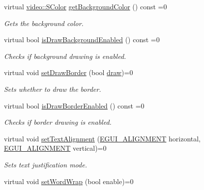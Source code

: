 \begin{DoxyCompactItemize}
virtual \hyperlink{classirr_1_1video_1_1SColor}{video\+::\+S\+Color} \hyperlink{classirr_1_1gui_1_1IGUIStaticText_a7149fff0b2c4159503f114807e0b0a83}{get\+Background\+Color} () const =0
\begin{DoxyCompactList}\small\item\em Gets the background color. \end{DoxyCompactList}\item 
virtual bool \hyperlink{classirr_1_1gui_1_1IGUIStaticText_ab6da7f10a72d023729d12c85e2926aec}{is\+Draw\+Background\+Enabled} () const =0
\begin{DoxyCompactList}\small\item\em Checks if background drawing is enabled. \end{DoxyCompactList}\item 
\mbox{\label{classirr_1_1gui_1_1IGUIStaticText_a48e8662debdf36b4eb3319a5fee937c6}} 
virtual void \hyperlink{classirr_1_1gui_1_1IGUIStaticText_a48e8662debdf36b4eb3319a5fee937c6}{set\+Draw\+Border} (bool \hyperlink{classirr_1_1gui_1_1IGUIElement_a1ef7eeaff67b8a9f4f37cacdc7e54be2}{draw})=0
\begin{DoxyCompactList}\small\item\em Sets whether to draw the border. \end{DoxyCompactList}\item 
virtual bool \hyperlink{classirr_1_1gui_1_1IGUIStaticText_a52478a36f77cfbc62e1f57a486e0a083}{is\+Draw\+Border\+Enabled} () const =0
\begin{DoxyCompactList}\small\item\em Checks if border drawing is enabled. \end{DoxyCompactList}\item 
virtual void \hyperlink{classirr_1_1gui_1_1IGUIStaticText_ad8635f1247971277543cfff6e1fa9277}{set\+Text\+Alignment} (\hyperlink{namespaceirr_1_1gui_a19eb5fb40e67f108cb16aba922ddaa2d}{E\+G\+U\+I\+\_\+\+A\+L\+I\+G\+N\+M\+E\+NT} horizontal, \hyperlink{namespaceirr_1_1gui_a19eb5fb40e67f108cb16aba922ddaa2d}{E\+G\+U\+I\+\_\+\+A\+L\+I\+G\+N\+M\+E\+NT} vertical)=0
\begin{DoxyCompactList}\small\item\em Sets text justification mode. \end{DoxyCompactList}\item 
virtual void \hyperlink{classirr_1_1gui_1_1IGUIStaticText_a2a47bc2f85ced3efc1d007c5bd61f906}{set\+Word\+Wrap} (bool enable)=0

\end{DoxyCompactItemize}
